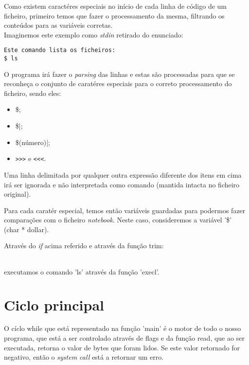 \documentclass[11pt,a4paper]{report}
\begin{document}
Como existem caractéres especiais no início de cada linha de código de um ficheiro, primeiro temos que fazer o processamento da mesma, filtrando os conteúdos para as variáveis corretas.
~\\

Imaginemos este exemplo como \textit{stdin} retirado do enunciado:
\begin{verbatim}
Este comando lista os ficheiros:
$ ls
\end{verbatim}

O programa irá fazer o \textit{parsing} das linhas e estas são processadas para que se reconheça o conjunto de caratéres especiais para o correto processamento do ficheiro, sendo eles:

\begin{itemize}
\item \$; 
\item \$|;
\item \$(número)|;
\item \verb|>>>| e \verb|<<<|.
\end{itemize}

Uma linha delimitada por qualquer outra expressão diferente dos itens em cima irá ser ignorada e não interpretada como comando (mantida intacta no ficheiro original).

Para cada caratér especial, temos então variáveis guardadas para podermos fazer comparações com o ficheiro \textit{notebook}. Neste caso, consideremos a variável '\$' (char * dollar).




Através do \textit{if} acima referido e através da função trim:

 ~\\

executamos o comando 'ls' através da função 'execl'.


\section{Ciclo principal}

O cíclo while que está representado na função 'main' é o motor de todo o nosso programa, que está a ser controlado através de flags e da função read, que ao ser executada, retorna o valor de bytes que foram lidos. Se este valor retornado for negativo, então o \textit{system call} está a retornar um erro. 
\end{document}
